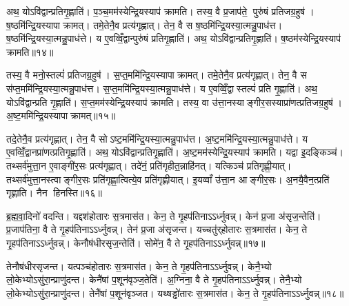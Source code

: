 अथ॒ योऽवि॑द्वान्प्रतिगृ॒ह्णाति॑। प॒ञ्च॒मम॑स्येन्द्रि॒यस्याप॑ क्रामति। तस्य॒ वै प्र॒जाप॑ते॒ पुरु॑षं प्रतिजग्र॒हुष॑। ष॒ष्ठमि॑न्द्रि॒यस्यापाक्रामत्। तमे॒तेनै॒व प्रत्य॑गृह्णात्। तेन॒ वै स ष॒ष्ठमि॑न्द्रि॒यस्या॒त्मन्नु॒पाध॑त्त। ष॒ष्ठमि॑न्द्रि॒यस्या॒त्मन्नु॒पाध॑त्ते। य ए॒वव्विँ॒द्वान्पुरु॑षं प्रतिगृ॒ह्णाति॑। अथ॒ योऽवि॑द्वान्प्रतिगृ॒ह्णाति॑। ष॒ष्ठम॑स्येन्द्रि॒यस्याप॑ क्रामति॥१४॥

तस्य॒ वै मनो॒स्तल्पं॑ प्रतिजग्र॒हुष॑। स॒प्त॒ममि॑न्द्रि॒यस्यापाक्रामत्। तमे॒तेनै॒व प्रत्य॑गृह्णात्। तेन॒ वै स स॑प्त॒ममि॑न्द्रि॒यस्या॒त्मन्नु॒पाध॑त्त। स॒प्त॒ममि॑न्द्रि॒यस्या॒त्मन्नु॒पाध॑त्ते। य ए॒वव्विँ॒द्वास्तल्पं॑ प्रति गृ॒ह्णाति॑। अथ॒ योऽवि॑द्वान्प्रति गृ॒ह्णाति॑। स॒प्त॒मम॑स्येन्द्रि॒यस्याप॑ क्रामति। तस्य॒ वा उ॑त्ता॒नस्याङ्गीर॒सस्याप्रा॑णत्प्रतिजग्र॒हुष॑। अ॒ष्ट॒ममि॑न्द्रि॒यस्यापाक्रामत्॥१५॥

तदे॒तेनै॒व प्रत्य॑गृह्णात्। तेन॒ वै सोऽष्ट॒ममि॑न्द्रि॒यस्या॒त्मन्नु॒पाध॑त्त। अ॒ष्ट॒ममि॑न्द्रि॒यस्या॒त्मन्नु॒पाध॑त्ते। य ए॒वव्विँ॒द्वानप्रा॑णत्प्रतिगृ॒ह्णाति॑। अथ॒ योऽवि॑द्वान्प्रतिगृ॒ह्णाति॑। अ॒ष्ट॒मम॑स्येन्द्रि॒यस्याप॑ क्रामति। यद्वा इ॒दङ्किञ्च॑। तथ्सर्व॑मुत्ता॒न ए॒वाङ्गी॑र॒सः प्रत्य॑गृह्णात्। तदे॑नं॒ प्रति॑गृहीत॒न्नाहि॑नत्। यत्किञ्च॑ प्रतिगृह्णी॒यात्। तथ्सर्व॑मुत्ता॒नस्त्वाङ्गीर॒सः प्रति॑गृह्णा॒त्वित्ये॒व प्रति॑गृह्णीयात्। इ॒यव्वाँ उ॑त्ता॒न आङ्गीर॒सः। अ॒नयै॒वैन॒त्प्रति॑ गृह्णाति। नैन हिनस्ति॥१६॥\anuvakamend[तृती॑यमिन्द्रि॒यस्यापाक्रामच्चतु॒र्थमि॑न्द्रि॒यस्या॒त्मन्नु॒पाध॒त्ताश्वं॑ प्रतिगृ॒ह्णाति॑ ष॒ष्ठम॑स्येन्द्रि॒यस्याप॑क्रामत्यष्ट॒ममि॑न्द्रि॒यस्यापाक्रामत्प्रतिगृह्णी॒याच्च॒त्वारि॑ च (तस्य॒ वा अ॒ग्नेर्‌हिर॑ण्य॒ सोम॑स्य॒ वास॒स्तदे॒तेन॑ रु॒द्रस्य॒ गान्तामे॒तेन॒ वरु॑ण॒स्याश्वं॑ प्र॒जाप॑ते॒ पुरु॑षं॒ मनो॒स्तल्प॒न्तमे॒तेनोत्ता॒नस्य॒ तदे॒तेनाप्रा॑ण॒द्यद्वै। अ॒र्धं तृती॑यमष्ट॒मं तच्च॑तु॒र्थं तां प॑ञ्च॒म ष॒ष्ठ स॑प्त॒मन्तम्। तदे॒तेन॒ द्वे तामे॒तेनैकं॒ तमे॒तेन॒ त्रीणि॒ तदे॒तेनैकम् ॥ )]

ब्र॒ह्म॒वा॒दिनो॑ वदन्ति। यद्दश॑होतारः स॒त्रमास॑त। केन॒ ते गृ॒हप॑तिनाऽऽर्ध्नुवन्न्। केन॑ प्र॒जा अ॑सृज॒न्तेति॑। प्र॒जाप॑तिना॒ वै ते गृ॒हप॑तिनाऽऽर्ध्नुवन्न्। तेन॑ प्र॒जा अ॑सृजन्त। यच्चतु॑र्‌होतारः स॒त्रमास॑त। केन॒ ते गृ॒हप॑तिनाऽऽर्ध्नुवन्न्। केनौष॑धीरसृज॒न्तेति॑। सोमे॑न॒ वै ते गृ॒हप॑तिनाऽऽर्ध्नुवन्न्॥१७॥

तेनौष॑धीरसृजन्त। यत्पञ्च॑होतारः स॒त्रमास॑त। केन॒ ते गृ॒हप॑तिनाऽऽर्ध्नुवन्न्। केनै॒भ्यो लो॒केभ्योऽसु॑रा॒न्प्राणु॑दन्त। केनै॑षां प॒शून॑वृञ्ज॒तेति॑। अ॒ग्निना॒ वै ते गृ॒हप॑तिनाऽऽर्ध्नुवन्न्। तेनै॒भ्यो लो॒केभ्योऽसु॑रा॒न्प्राणु॑दन्त। तेनै॑षां प॒शून॑वृञ्जत। यथ्षड्ढो॑तारः स॒त्रमास॑त। केन॒ ते गृ॒हप॑तिनाऽऽर्ध्नुवन्न्॥१८॥

